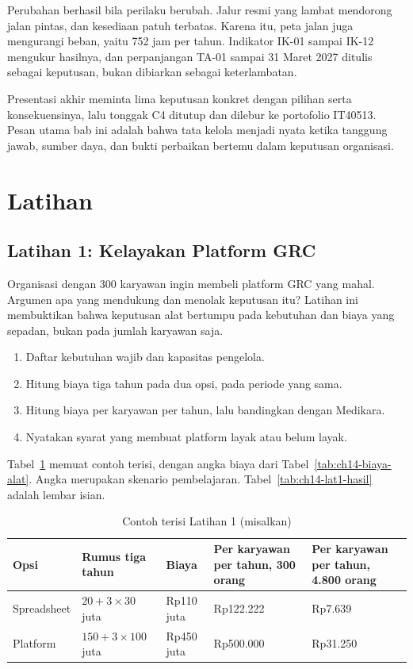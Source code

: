 Perubahan berhasil bila perilaku berubah. Jalur resmi yang lambat mendorong jalan pintas, dan
kesediaan patuh terbatas. Karena itu, peta jalan juga mengurangi beban, yaitu 752 jam per tahun.
Indikator IK-01 sampai IK-12 mengukur hasilnya, dan perpanjangan TA-01 sampai 31 Maret 2027 ditulis
sebagai keputusan, bukan dibiarkan sebagai keterlambatan.

Presentasi akhir meminta lima keputusan konkret dengan pilihan serta konsekuensinya, lalu tonggak C4
ditutup dan dilebur ke portofolio IT40513. Pesan utama bab ini adalah bahwa tata kelola menjadi
nyata ketika tanggung jawab, sumber daya, dan bukti perbaikan bertemu dalam keputusan organisasi.

\section{Latihan}

\subsection*{Latihan 1: Kelayakan Platform GRC}

Organisasi dengan 300 karyawan ingin membeli platform GRC yang mahal. Argumen apa yang mendukung
dan menolak keputusan itu? Latihan ini membuktikan bahwa keputusan alat bertumpu pada kebutuhan dan
biaya yang sepadan, bukan pada jumlah karyawan saja.
\begin{enumerate}
  \item Daftar kebutuhan wajib dan kapasitas pengelola.
  \item Hitung biaya tiga tahun pada dua opsi, pada periode yang sama.
  \item Hitung biaya per karyawan per tahun, lalu bandingkan dengan Medikara.
  \item Nyatakan syarat yang membuat platform layak atau belum layak.
\end{enumerate}

Tabel~\ref{tab:ch14-lat1-contoh} memuat contoh terisi, dengan angka biaya dari
Tabel~\ref{tab:ch14-biaya-alat}. Angka merupakan skenario pembelajaran.
Tabel~\ref{tab:ch14-lat1-hasil} adalah lembar isian.

\begin{table}[!htb]
  \centering\small
  \caption{Contoh terisi Latihan 1 (misalkan)}\label{tab:ch14-lat1-contoh}
  \begin{tabularx}{\textwidth}{|>{\raggedright\arraybackslash}p{}|>{\raggedright\arraybackslash}X|>{\raggedright\arraybackslash}p{}|>{\raggedright\arraybackslash}X|>{\raggedright\arraybackslash}X|}
    \hline
    \textbf{Opsi} & \textbf{Rumus tiga tahun} & \textbf{Biaya} & \textbf{Per karyawan per tahun, 300
    orang} & \textbf{Per karyawan per tahun, 4.800 orang} \\ \hline
    Spreadsheet & $20 + 3 \times 30$ juta & Rp110 juta & Rp122.222 & Rp7.639 \\ \hline
    Platform & $150 + 3 \times 100$ juta & Rp450 juta & Rp500.000 & Rp31.250 \\ \hline
  \end{tabularx}
\end{table}

